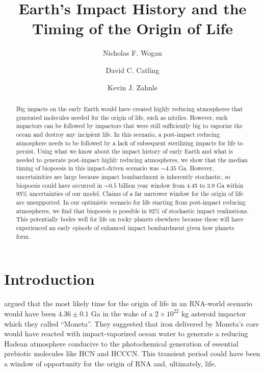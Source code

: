 \documentclass[preprint]{aastex63}
\begin{document}
\title{Earth's Impact History and the Timing of the Origin of Life}
\author{Nicholas F. Wogan}

\author{David C. Catling}

\author{Kevin J. Zahnle}

\begin{abstract}
Big impacts on the early Earth would have created highly reducing atmospheres that generated molecules needed for the origin of life, such as nitriles. However, such impactors can be followed by impactors that were still sufficiently big to vaporize the ocean and destroy any incipient life. In this scenario, a post-impact reducing atmosphere needs to be followed by a lack of subsequent sterilizing impacts for life to persist. Using what we know about the impact history of early Earth and what is needed to generate post-impact highly reducing atmospheres, we show that  the median timing of biopoesis in this impact-driven scenario was $\sim 4.35$ Ga. However, uncertainities are large because impact bombardment is inherently stochastic, so biopoesis could have occurred in $\sim 0.5$ billion year window from 4.45 to 3.9 Ga within 95\% uncertainties of our model. Claims of a far narrower window for the origin of life are unsupported. In our optimistic scenario for life starting from post-impact reducing atmospheres, we find that biopoesis is possible in 92\% of stochastic impact realizations. This potentially bodes well for life on rocky planets elsewhere because these will have experienced an early episode of enhanced impact bombardment given how planets form.
\end{abstract}

\section{Introduction}

\citet{Benner_2020} argued that the most likely time for the origin of life in an RNA-world scenario would have been $4.36 \pm 0.1$ Ga in the wake of a $2 \times 10^{22}$ kg asteroid impactor which they called “Moneta”. They suggested that iron delivered by Moneta's core would have reacted with impact-vaporized ocean water to generate a reducing Hadean atmosphere conducive to the photochemical generation of essential prebiotic molecules like HCN and HCCCN. This transient period could have been a window of opportunity for the origin of RNA and, ultimately, life.
\end{document}
